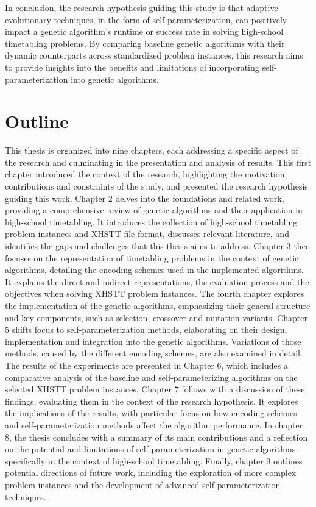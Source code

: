 \documentclass[english,examples]{isasthesis}
\begin{document}
In conclusion, the research hypothesis guiding this study is that adaptive
evolutionary techniques, in the form of self-parameterization, can positively
impact a genetic algorithm's runtime or success rate in solving high-school
timetabling problems.
By comparing baseline genetic algorithms with their dynamic counterparts across
standardized problem instances, this research aims to provide insights into the
benefits and limitations of incorporating self-parameterization into genetic
algorithms.

\section{Outline}
This thesis is organized into nine chapters, each addressing a specific aspect
of the research and culminating in the presentation and analysis of results.
%
This first chapter introduced the context of the research, highlighting the
motivation, contributions and constraints of the study, and presented the
research hypothesis guiding this work.
%
Chapter 2 delves into the foundations and related work, providing a
comprehensive review of genetic algorithms and their application in high-school
timetabling. It introduces the collection of high-school timetabling problem
instances and XHSTT file format, discusses relevant literature, and identifies
the gaps and challenges that this thesis aims to address.
%
Chapter 3 then focuses on the representation of timetabling problems in the
context of genetic algorithms, detailing the encoding schemes used in the
implemented algorithms. It explains the direct and indirect representations,
the evaluation process and the objectives when solving XHSTT problem instances.
%
The fourth chapter explores the implementation of the genetic algorithms,
emphasizing their general structure and key components, such as selection,
crossover and mutation variants.
%
Chapter 5 shifts focus to self-parameterization
methods, elaborating on their design, implementation and integration into the
genetic algorithms. Variations of those methods, caused by the different
encoding schemes, are also examined in detail.
%
The results of the experiments are presented in Chapter 6, which includes a
comparative analysis of the baseline and self-parameterizing algorithms on the
selected XHSTT problem instances.
%
Chapter 7 follows with a discussion of these
findings, evaluating them in the context of the research hypothesis. It explores
the implications of the results, with particular focus on how encoding
schemes and self-parameterization methods affect the algorithm performance.
%
In chapter 8, the thesis concludes with a summary of its main contributions
and a reflection on the potential and limitations of self-parameterization in
genetic algorithms - specifically in the context of high-school timetabling.
%
Finally, chapter 9 outlines potential directions of future work, including
the exploration of more complex problem instances and the development of
advanced self-parameterization techniques.
\end{document}
